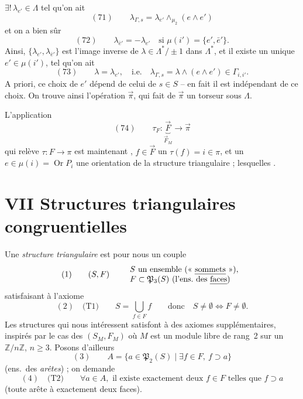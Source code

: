 \documentclass[11pt,a4paper]{article}
\begin{document}


$\exists !\, \lambda_{e'} \in \Lambda$ tel qu'on ait
\[
(71) \qquad \lambda_{\Gamma,s} = \lambda_{e'} \wedge_{\mu_2} (e \wedge e')
\]
et on a bien sûr
\[
(72) \qquad \lambda_{\bar e'} = -\lambda_{e'} \quad \text{si } \mu(i') = \{e', \bar e'\}.
\]
Ainsi, $\{\lambda_{e'}, \lambda_{\bar e'}\}$ est l'image inverse de $\lambda \in \Lambda^{*}/\pm 1$ dans $\Lambda^{*}$, et il existe un unique $e' \in \mu(i')$, tel qu'on ait
\[
(73) \qquad \lambda = \lambda_{e'}, \quad \text{i.e.} \quad \lambda_{\Gamma,s} = \lambda \wedge (e \wedge e') \in \Gamma_{i,i'} .
\]
A priori, ce choix de $e'$ dépend de celui de $s \in S$ -- en fait il est indépendant de ce choix. On trouve ainsi l'opération  \struck{\ill{}} $\vec\pi$, qui fait de $\vec\pi$ un torseur sous $\Lambda$.

L'application
\[
(74) \qquad \tau_F : \underbrace{\vec F}_{\vec F_M} \longrightarrow \vec\pi
\]
qui relève $\tau : F \to \pi$ est maintenant ,  \struck{\ill{}}   $f \in \vec F$   un $\tau(f) = i \in \pi$, et un $e \in \mu(i) = \operatorname{Or} P_i$ \ill{} une orientation de la structure triangulaire ; lesquelles \ill{} \ill{} \ill{}.

\section{VII Structures triangulaires congruentielles}

Une \emph{structure triangulaire} est pour nous un couple
\[
(1) \qquad (S, F) \qquad
\begin{array}{l}
S \text{ un ensemble (« \emph{sommets} »),} \\
F \subset \mathfrak{P}_3(S) \ \text{(l'ens.\ des \emph{faces})}
\end{array}
\]
satisfaisant à l'axiome
\[
(2) \quad \text{(T1)} \qquad S = \bigcup_{f \in F} f \qquad \text{donc} \quad S \neq \emptyset \iff F \neq \emptyset .
\]
Les structures qui nous intéressent satisfont à des axiomes supplémentaires, inspirés par le cas des $(S_M, F_M)$ où $M$ est un module libre de rang~2 sur un $\mathbb{Z}/n\mathbb{Z}$, $n \geq 3$. Posons d'ailleurs
\[
(3) \qquad A = \{ a \in \mathfrak{P}_2(S) \mid \exists f \in F,\ f \supset a \}
\]
(ens.\ des \emph{arêtes}) ; on demande
\[
(4) \quad \text{(T2)} \qquad \forall a \in A, \text{ il existe exactement deux } f \in F \text{ telles que } f \supset a
\]
(toute arête  à exactement deux faces).
\end{document}
